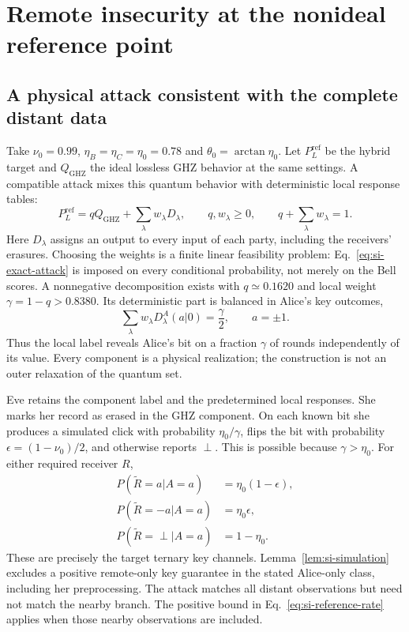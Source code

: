 \documentclass[aps,10pt,onecolumn,prx,superscriptaddress,longbibliography,nofootinbib]{revtex4-2}
\newcommand{\perpout}{\perp}
\begin{document}
\section{Remote insecurity at the nonideal reference point}\label{app:attack}

\subsection{A physical attack consistent with the complete distant data}

Take \(\nu_0=0.99\), \(\eta_B=\eta_C=\eta_0=0.78\) and \(\theta_0=\arctan\eta_0\). Let \(P_L^{\mathrm{ref}}\) be the hybrid target and \(Q_{\mathrm{GHZ}}\) the ideal lossless GHZ behavior at the same settings. A compatible attack mixes this quantum behavior with deterministic local response tables:
\begin{equation}
 P_L^{\mathrm{ref}}=qQ_{\mathrm{GHZ}}+\sum_\lambda w_\lambda D_\lambda,\qquad
 q,w_\lambda\geq0,\qquad q+\sum_\lambda w_\lambda=1.
 \label{eq:si-exact-attack}
\end{equation}
Here \(D_\lambda\) assigns an output to every input of each party, including the receivers' erasures. Choosing the weights is a finite linear feasibility problem: Eq.~\eqref{eq:si-exact-attack} is imposed on every conditional probability, not merely on the Bell scores. A nonnegative decomposition exists with \(q\simeq0.1620\) and local weight \(\gamma=1-q>0.8380\). Its deterministic part is balanced in Alice's key outcomes,
\begin{equation}
 \sum_\lambda w_\lambda D_\lambda^A(a|0)=\frac{\gamma}{2},
 \qquad a=\pm1.
\end{equation}
Thus the local label reveals Alice's bit on a fraction \(\gamma\) of rounds independently of its value. Every component is a physical realization; the construction is not an outer relaxation of the quantum set.

Eve retains the component label and the predetermined local responses. She marks her record as erased in the GHZ component. On each known bit she produces a simulated click with probability \(\eta_0/\gamma\), flips the bit with probability \(\epsilon=(1-\nu_0)/2\), and otherwise reports \(\perpout\). This is possible because \(\gamma>\eta_0\). For either required receiver \(R\),
\begin{equation}
 \begin{aligned}
 P(\widetilde R=a|A=a)&=\eta_0(1-\epsilon),\\
 P(\widetilde R=-a|A=a)&=\eta_0\epsilon,\\
 P(\widetilde R=\perpout|A=a)&=1-\eta_0.
 \end{aligned}
\end{equation}
These are precisely the target ternary key channels. Lemma~\ref{lem:si-simulation} excludes a positive remote-only key guarantee in the stated Alice-only class, including her preprocessing. The attack matches all distant observations but need not match the nearby branch. The positive bound in Eq.~\eqref{eq:si-reference-rate} applies when those nearby observations are included.
\end{document}
